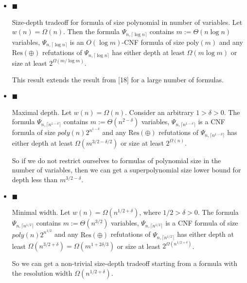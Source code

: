 \documentclass[10pt,a4paper]{article}
\begin{document}
\begin{itemize}


\item 
$\blacksquare$ 


Size-depth tradeoff for formula of size polynomial in number of variables.
Let $w(n)=\Omega(n)$.
Then the formula $\Psi_{n,\lceil\log n\rceil}$ contains $m:=\Theta(n\log n)$
variables, $\Psi_{n,\lceil\log n\rceil}$ is an $O(\log m)$-CNF formula of size
$\mathrm{poly}(m)$ and any $\mathrm{Res}(\oplus)$ refutations of $\Psi_{n,\lceil\log n\rceil}$ has
either depth at least $\Omega(m\log m)$ or size at least $2^{\Omega(m/\log m)}$.\par




This result extends the result from [18] for a large number of formulas.\par





\item 
$\blacksquare$ 


Maximal depth.
Let $w(n)=\Omega(n)$. Consider an arbitrary $1>\delta>0$.
The formula $\Psi_{n,\lceil n^{1-\delta}\rceil}$ contains $m:=\Theta(n^{2-\delta})$
variables, $\Psi_{n,\lceil n^{1-\delta}\rceil}$ is a CNF formula of size
$poly(n)2^{n^{1-\delta}}$ and any $\mathrm{Res}(\oplus)$ refutations of
$\Psi_{n,\lceil n^{1-\delta}\rceil}$ has either depth at least $\Omega(m^{3/2-\delta/2})$
or size at least $2^{\Omega(n)}$.\par




So if we do not restrict ourselves to formulas of polynomial size in the number of variables,
then we can get a superpolynomial size lower bound for depth less than $m^{3/2-\delta}$.\par





\item 
$\blacksquare$ 


Minimal width.
Let $w(n)=\Omega\left(n^{1/2+\delta}\right)$, where $1/2>\delta>0$.
The formula $\Psi_{n,\lceil n^{1/2}\rceil}$ contains $m:=\Theta(n^{3/2})$ variables,
$\Psi_{n,\lceil n^{1/2}\rceil}$ is a CNF formula of size $poly(n)2^{n^{1/2}}$
and any $\mathrm{Res}(\oplus)$ refutations of $\Psi_{n,\lceil n^{1/2}\rceil}$ has either
depth at least $\Omega\left(n^{3/2+\delta}\right)=\Omega\left(m^{1+2\delta/3}\right)$ or size at least
$2^{\Omega\left(n^{1/2+\delta}\right)}$.\par




So we can get a non-trivial size-depth tradeoff starting from a formula with the resolution width
$\Omega\left(n^{1/2+\delta}\right)$.\par





\end{itemize}
\end{document}

